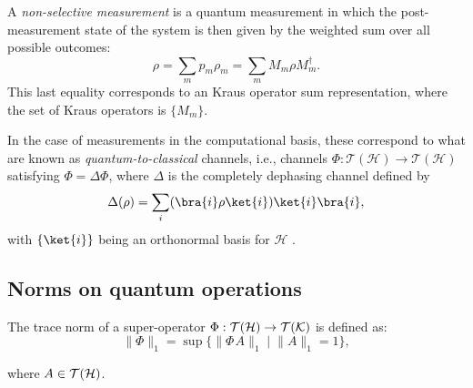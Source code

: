\begin{definition}
A \emph{non-selective measurement} is a quantum measurement in which the post-measurement state of the system is then given by the weighted sum over all possible outcomes:
\[
\rho = \sum_m p_m \rho_m = \sum_m M_m \rho M_m^{\dag}.
\]
This last equality corresponds to an Kraus operator sum representation, where the set of Kraus operators is $\{M_{m}\}$.
\end{definition}

In the case of measurements in the computational basis, these correspond to what are known as \emph{quantum-to-classical} channels, i.e., channels $\Phi: \mathcal{T}(\mathcal{H}) \to \mathcal{T}(\mathcal{H})$ satisfying $\Phi = \Delta   \Phi$, where $\Delta$ is the completely dephasing channel defined by
\begin{equation} \label{eq:CDeph}
  \Delta(\rho) = \sum_i (\bra{i} \rho \ket{i})  \ket{i}\bra{i},
\end{equation}
with $\{\ket{i}\}$ being an orthonormal basis for $\mathcal{H}$ \cite[Proposition 2.36]{watrous2018theory}.

\subsection{Norms on quantum operations}
\begin{definition} \label{def:trace_norm_superoperator}
  The trace norm of a super-operator $\Phi: \mathcal{T}(\mathcal{H}) \rightarrow \mathcal{T}(\mathcal{K})$ is defined as:
  \begin{equation*} 
    \lVert \Phi \rVert_{1} =  \sup\{\lVert \Phi \hspace{1pt} A \rVert_{1}   \mid  \lVert A \rVert_{1}=1\}, 
  \end{equation*}
\end{definition}
where $A \in \mathcal{T}(\mathcal{H})$.




